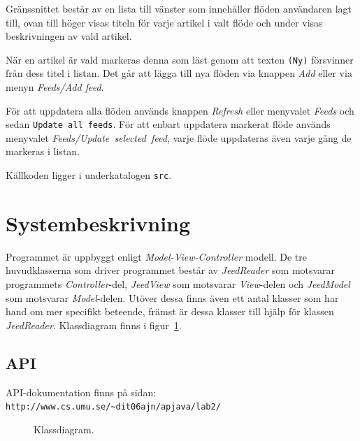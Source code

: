 \documentclass[titlepage, twoside, a4paper, 12pt]{article}
\begin{document}
Gränssnittet består av en lista till vänster som innehåller flöden
användaren lagt till, ovan till höger visas titeln för varje artikel i
valt flöde och under visas beskrivningen av vald artikel.

När en artikel är vald markeras denna som läst genom att texten
\verb!(Ny)! försvinner från dess titel i listan. Det går att lägga
till nya flöden via knappen \textit{Add} eller via menyn
\textit{Feeds/Add feed}.

För att uppdatera alla flöden används knappen \textit{Refresh} eller
menyvalet \textit{Feeds} och sedan \texttt{Update~all~feeds}. För att
enbart uppdatera markerat flöde används menyvalet
\textit{Feeds/Update~selected~feed}, varje flöde uppdateras även varje
gång de markeras i listan.

Källkoden ligger i underkatalogen \verb!src!.

\section{Systembeskrivning}\label{Systembeskrivning}
Programmet är uppbyggt enligt \textit{Model-View-Controller}
modell. De tre huvudklasserna som driver programmet består av
\textit{JeedReader} som motsvarar programmets \textit{Controller}-del,
\textit{JeedView} som motsvarar \textit{View}-delen och
\textit{JeedModel} som motsvarar \textit{Model}-delen. Utöver dessa
finns även ett antal klasser som har hand om mer specifikt beteende,
främst är dessa klasser till hjälp för klassen
\textit{JeedReader}. Klassdiagram finns i figur~\ref{fig:classUML}.

\subsection{API}
API-dokumentation finns på sidan:\\
\verb!http://www.cs.umu.se/~dit06ajn/apjava/lab2/!

\newpage
\begin{figure}[H]
  \begin{center}
    \caption{Klassdiagram.}
    \label{fig:classUML}
  \end{center}
\end{figure}
\end{document}
